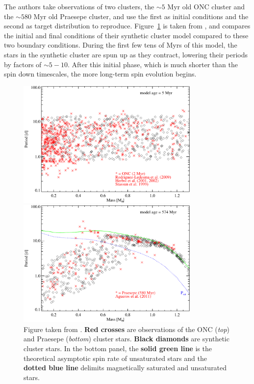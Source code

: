 The authors take observations of two clusters, the $\sim 5$ Myr old ONC cluster and the $\sim 580$ Myr old Praesepe cluster, and use the first as initial conditions and the second as target distribution to reproduce. Figure~\ref{fig:introduction:Matt 2015 figure 2} is taken from \citet{matt2015}, and compares the initial and final conditions of their synthetic cluster model compared to these two boundary conditions. During the first few tens of Myrs of this model, the stars in the synthetic cluster are spun up as they contract, lowering their periods by factors of $\sim 5-10$. After this initial phase, which is much shorter than the spin down timescales, the more long-term spin evolution begins.
\begin{figure}
    \centering
    \begin{minipage}[b]{\textwidth}
        \centering
        \includegraphics[width=0.8\textwidth]{figures/introduction/matt_2015_fig2a.pdf}
    \end{minipage}
    \begin{minipage}[b]{\textwidth}
        \centering
        \includegraphics[width=0.8\textwidth]{figures/introduction/matt_2015_fig2b.pdf}
    \end{minipage}
    \caption{Figure taken from \citet{matt2015}. {\bf Red crosses} are observations of the ONC ({\it top}) and Praesepe ({\it bottom}) cluster stars. {\bf Black diamonds} are synthetic cluster stars. In the bottom panel, the {\bf solid green line} is the theoretical asymptotic spin rate of unsaturated stars and the {\bf dotted blue line} delimits magnetically saturated and unsaturated stars.}
    \label{fig:introduction:Matt 2015 figure 2}
\end{figure}


